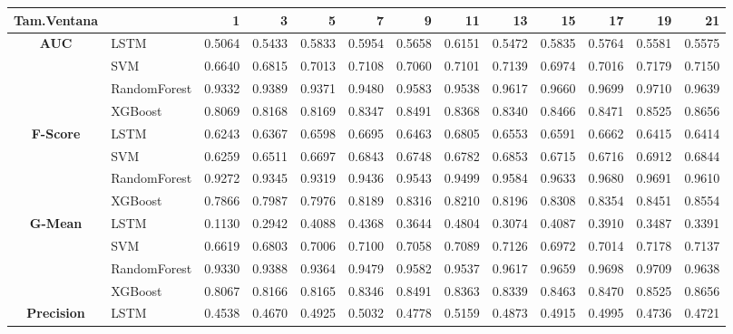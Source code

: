 \begin{table}[h]
	\centering
	\begin{adjustbox}{max width=15cm}
		\begin{tabular}{|c|l|r|r|r|r|r|r|r|r|r|r|r|}
			\hline
			\textbf{Tam.Ventana} &         &      1  &      3  &      5  &      7  &      9  &      11 &      13 &      15 &      17 &      19 &      21 \\
			\hline
			\textbf{AUC} & LSTM &  0.5064 &  0.5433 &  0.5833 &  0.5954 &  0.5658 &  0.6151 &  0.5472 &  0.5835 &  0.5764 &  0.5581 &  0.5575 \\
			& SVM &  0.6640 &  0.6815 &  0.7013 &  0.7108 &  0.7060 &  0.7101 &  0.7139 &  0.6974 &  0.7016 &  0.7179 &  0.7150 \\
			& RandomForest &  0.9332 &  0.9389 &  0.9371 &  0.9480 &  0.9583 &  0.9538 &  0.9617 &  0.9660 &  0.9699 &  0.9710 &  0.9639 \\
			& XGBoost &  0.8069 &  0.8168 &  0.8169 &  0.8347 &  0.8491 &  0.8368 &  0.8340 &  0.8466 &  0.8471 &  0.8525 &  0.8656 \\
			\hline
			\textbf{F-Score} & LSTM &  0.6243 &  0.6367 &  0.6598 &  0.6695 &  0.6463 &  0.6805 &  0.6553 &  0.6591 &  0.6662 &  0.6415 &  0.6414 \\
			& SVM &  0.6259 &  0.6511 &  0.6697 &  0.6843 &  0.6748 &  0.6782 &  0.6853 &  0.6715 &  0.6716 &  0.6912 &  0.6844 \\
			& RandomForest &  0.9272 &  0.9345 &  0.9319 &  0.9436 &  0.9543 &  0.9499 &  0.9584 &  0.9633 &  0.9680 &  0.9691 &  0.9610 \\
			& XGBoost &  0.7866 &  0.7987 &  0.7976 &  0.8189 &  0.8316 &  0.8210 &  0.8196 &  0.8308 &  0.8354 &  0.8451 &  0.8554 \\
			\hline
			\textbf{G-Mean} & LSTM &  0.1130 &  0.2942 &  0.4088 &  0.4368 &  0.3644 &  0.4804 &  0.3074 &  0.4087 &  0.3910 &  0.3487 &  0.3391 \\
			& SVM &  0.6619 &  0.6803 &  0.7006 &  0.7100 &  0.7058 &  0.7089 &  0.7126 &  0.6972 &  0.7014 &  0.7178 &  0.7137 \\
			& RandomForest &  0.9330 &  0.9388 &  0.9364 &  0.9479 &  0.9582 &  0.9537 &  0.9617 &  0.9659 &  0.9698 &  0.9709 &  0.9638 \\
			& XGBoost &  0.8067 &  0.8166 &  0.8165 &  0.8346 &  0.8491 &  0.8363 &  0.8339 &  0.8463 &  0.8470 &  0.8525 &  0.8656 \\
			\hline
			\textbf{Precision} & LSTM &  0.4538 &  0.4670 &  0.4925 &  0.5032 &  0.4778 &  0.5159 &  0.4873 &  0.4915 &  0.4995 &  0.4736 &  0.4721 \\

\end{tabular}
\end{adjustbox}
\end{table}
